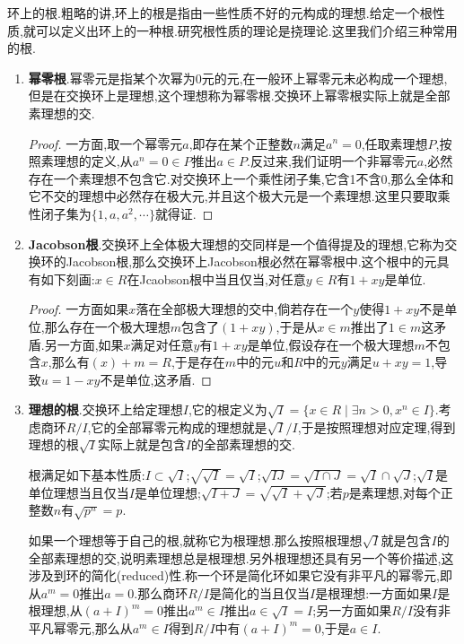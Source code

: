 环上的根.粗略的讲,环上的根是指由一些性质不好的元构成的理想.给定一个根性质,就可以定义出环上的一种根.研究根性质的理论是挠理论.这里我们介绍三种常用的根.
\begin{enumerate}
	\item \textbf{幂零根}.幂零元是指某个次幂为0元的元,在一般环上幂零元未必构成一个理想,但是在交换环上是理想,这个理想称为幂零根.交换环上幂零根实际上就是全部素理想的交.
	\begin{proof}
		
		一方面,取一个幂零元$a$,即存在某个正整数$n$满足$a^n=0$,任取素理想$P$,按照素理想的定义,从$a^n=0\in P$推出$a\in P$.反过来,我们证明一个非幂零元$a$,必然存在一个素理想不包含它.对交换环上一个乘性闭子集,它含1不含0,那么全体和它不交的理想中必然存在极大元,并且这个极大元是一个素理想.这里只要取乘性闭子集为$\{1,a,a^2,\cdots\}$就得证.
	\end{proof}
	\item \textbf{Jacobson根}.交换环上全体极大理想的交同样是一个值得提及的理想,它称为交换环的Jacobson根,那么交换环上Jacobson根必然在幂零根中.这个根中的元具有如下刻画:$x\in R$在Jcaobson根中当且仅当,对任意$y\in R$有$1+xy$是单位.
	\begin{proof}
		
		一方面如果$x$落在全部极大理想的交中,倘若存在一个$y$使得$1+xy$不是单位,那么存在一个极大理想$m$包含了$(1+xy)$,于是从$x\in m$推出了$1\in m$这矛盾.另一方面,如果$x$满足对任意$y$有$1+xy$是单位,假设存在一个极大理想$m$不包含$x$,那么有$(x)+m=R$,于是存在$m$中的元$u$和$R$中的元$y$满足$u+xy=1$,导致$u=1-xy$不是单位,这矛盾.
	\end{proof}
	\item \textbf{理想的根}.交换环上给定理想$I$,它的根定义为$\sqrt{I}=\{x\in R\mid \exists n>0,x^n\in I\}$.考虑商环$R/I$,它的全部幂零元构成的理想就是$\sqrt{I}/I$,于是按照理想对应定理,得到理想的根$\sqrt{I}$实际上就是包含$I$的全部素理想的交.
	
	根满足如下基本性质:$I\subset\sqrt{I}$;$\sqrt{\sqrt{I}}=\sqrt{I}$;$\sqrt{IJ}=\sqrt{I\cap J}=\sqrt{I}\cap\sqrt{J}$;$\sqrt{I}$是单位理想当且仅当$I$是单位理想;$\sqrt{I+J}=\sqrt{\sqrt{I}+\sqrt{J}}$;若$p$是素理想,对每个正整数$n$有$\sqrt{p^n}=p$.
	
	如果一个理想等于自己的根,就称它为根理想.那么按照根理想$\sqrt{I}$就是包含$I$的全部素理想的交,说明素理想总是根理想.另外根理想还具有另一个等价描述,这涉及到环的简化(reduced)性.称一个环是简化环如果它没有非平凡的幂零元,即从$a^m=0$推出$a=0$.那么商环$R/I$是简化的当且仅当$I$是根理想:一方面如果$I$是根理想,从$(a+I)^m=0$推出$a^m\in I$推出$a\in\sqrt{I}=I$;另一方面如果$R/I$没有非平凡幂零元,那么从$a^m\in I$得到$R/I$中有$(a+I)^m=0$,于是$a\in I$.
\end{enumerate}


